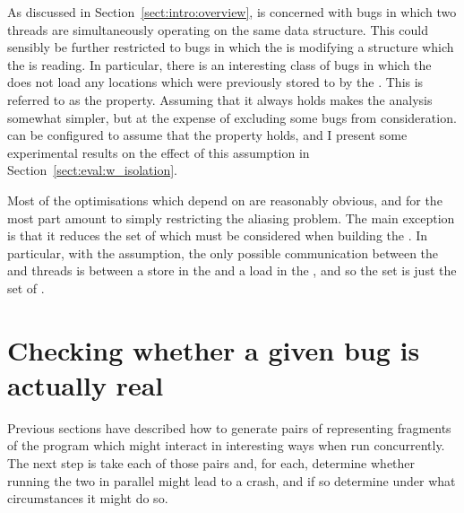 As discussed in Section~\ref{sect:intro:overview}, {\technique} is
concerned with bugs in which two threads are simultaneously operating
on the same data structure.  This could sensibly be further restricted
to bugs in which the  is modifying a
structure which the  is reading.  In
particular, there is an interesting class of bugs in which the
 does not load any locations which were
previously stored to by the .  This is
referred to as the  property.  Assuming that
it always holds makes the analysis somewhat simpler, but at the
expense of excluding some bugs from consideration.  {\Implementation}
can be configured to assume that the property holds, and I present
some experimental results on the effect of this assumption in
Section~\ref{sect:eval:w_isolation}.

Most of the optimisations which depend on  are
reasonably obvious, and for the most part amount to simply restricting
the aliasing problem.  The main exception is that it reduces the set
of  which must be considered when
building the  .  In
particular, with the  assumption, the only
possible communication between the  and
 threads is between a store in the
 and a load in the , and so the  set is
just the set of .

\section{Checking whether a given bug is actually real}
\label{sect:using:check_realness}

Previous sections have described how to generate pairs of
{\StateMachines} representing fragments of the program which might
interact in interesting ways when run concurrently.  The next step is
take each of those pairs and, for each, determine whether running the
two {\StateMachines} in parallel might lead to a crash, and if so
determine under what circumstances it might do so.


